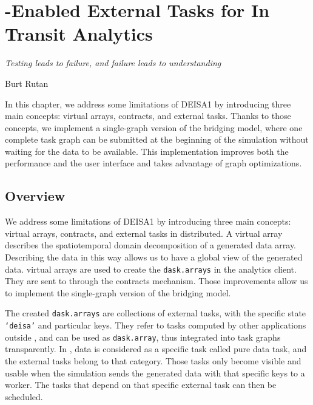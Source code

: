 \newpage




\chapter{\dask-Enabled External Tasks for In Transit Analytics}\label{deetitachapter}
\vspace{20mm}

\epigraph{\textit{Testing leads to failure, and failure leads to understanding
}} {Burt Rutan}
\vfill

In this chapter, we address some limitations of DEISA1 by introducing three main concepts: \deisa virtual arrays, contracts, and external tasks. 
Thanks to those concepts, we implement a single-graph version of the \deisa bridging model, where one complete task graph can be submitted at the beginning of the simulation without waiting for the data to be available. 
This implementation improves both the performance and the user interface and takes advantage of \dask graph optimizations.  

\newpage
\section{Overview}

We address some limitations of DEISA1 by introducing three main concepts: \deisa virtual arrays, contracts, and external tasks in \dask distributed. A \deisa virtual array describes the spatiotemporal domain decomposition of a generated data array. 
Describing the data in this way allows us to have a global view of the generated data. \deisa virtual arrays are used to create the \texttt{dask.arrays} in the analytics client. They are sent to \dask through the contracts mechanism. Those improvements allow us to implement the single-graph version of the \deisa bridging model. 

The created \texttt{dask.arrays} are collections of external tasks, with the specific state \texttt{‘deisa’} and particular keys. They refer to tasks computed by other applications outside \dask, and can be used as \texttt{dask.array}, thus integrated into \dask task graphs transparently. In \dask, data is considered as a specific task called pure data task, and the external tasks belong to that category. Those tasks only become visible and usable when the simulation sends the generated data with that specific keys to a worker. The tasks that depend on that specific external task can then be scheduled. 

